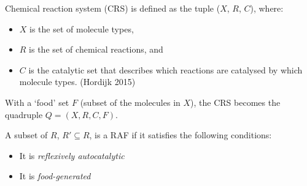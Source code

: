 \documentclass{beamer}
\begin{document}


\begin{frame}
Chemical reaction system (CRS) is defined as the tuple ($X$, $R$, $C$), where:

\begin{itemize} 
\item $X$ is the set of molecule types, 
\item $R$ is the set of chemical reactions, and 
\item $C$ is the catalytic set that describes which reactions are catalysed by which molecule types. (Hordijk 2015)
\end{itemize}

\vspace{3mm}
With a `food' set $F$ (subset of the molecules in $X$), the CRS becomes the quadruple $Q = (X, R, C, F)$.
\end{frame}


\begin{frame}
A subset of $R$, $R' \subseteq R$, is a RAF if it satisfies the following conditions:

\begin{itemize}
\item It is \textit{reflexively autocatalytic} %
\item It is \textit{food-generated} %
\end{itemize}


\end{frame}
\end{document}
